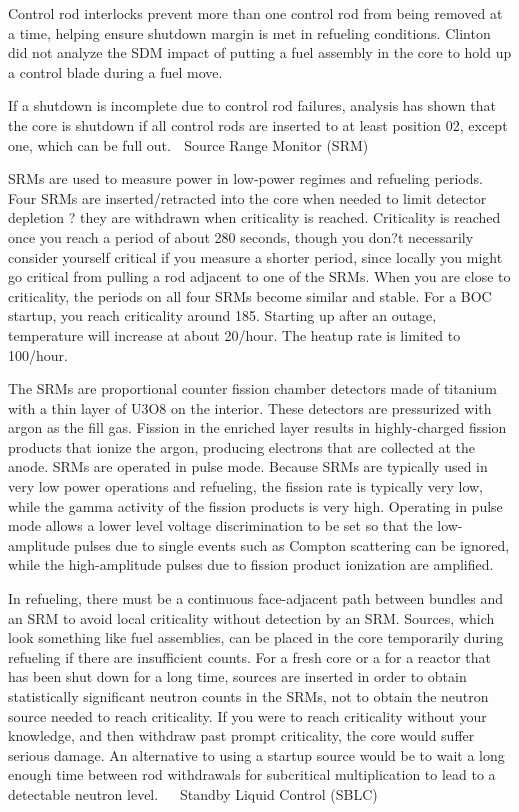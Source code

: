 \documentclass[10pt]{article}
\begin{document}
Control rod interlocks prevent more than one control rod from being removed at a time, helping ensure shutdown margin is met in refueling conditions. Clinton did not analyze the SDM impact of putting a fuel assembly in the core to hold up a control blade during a fuel move. 

If a shutdown is incomplete due to control rod failures, analysis has shown that the core is shutdown if all control rods are inserted to at least position 02, except one, which can be full out. 
Source Range Monitor (SRM)

SRMs are used to measure power in low-power regimes and refueling periods. Four SRMs are inserted/retracted into the core when needed to limit detector depletion ? they are withdrawn when criticality is reached. Criticality is reached once you reach a period of about 280 seconds, though you don?t necessarily consider yourself critical if you measure a shorter period, since locally you might go critical from pulling a rod adjacent to one of the SRMs. When you are close to criticality, the periods on all four SRMs become similar and stable. For a BOC startup, you reach criticality around 185. Starting up after an outage, temperature will increase at about 20/hour. The heatup rate is limited to 100/hour. 

The SRMs are proportional counter fission chamber detectors made of titanium with a thin layer of U3O8 on the interior. These detectors are pressurized with argon as the fill gas. Fission in the enriched layer results in highly-charged fission products that ionize the argon, producing electrons that are collected at the anode. SRMs are operated in pulse mode. Because SRMs are typically used in very low power operations and refueling, the fission rate is typically very low, while the gamma activity of the fission products is very high. Operating in pulse mode allows a lower level voltage discrimination to be set so that the low-amplitude pulses due to single events such as Compton scattering can be ignored, while the high-amplitude pulses due to fission product ionization are amplified.  

In refueling, there must be a continuous face-adjacent path between bundles and an SRM to avoid local criticality without detection by an SRM. Sources, which look something like fuel assemblies, can be placed in the core temporarily during refueling if there are insufficient counts. For a fresh core or a for a reactor that has been shut down for a long time, sources are inserted in order to obtain statistically significant neutron counts in the SRMs, not to obtain the neutron source needed to reach criticality. If you were to reach criticality without your knowledge, and then withdraw past prompt criticality, the core would suffer serious damage. An alternative to using a startup source would be to wait a long enough time between rod withdrawals for subcritical multiplication to lead to a detectable neutron level. 


Standby Liquid Control (SBLC)
\end{document}
